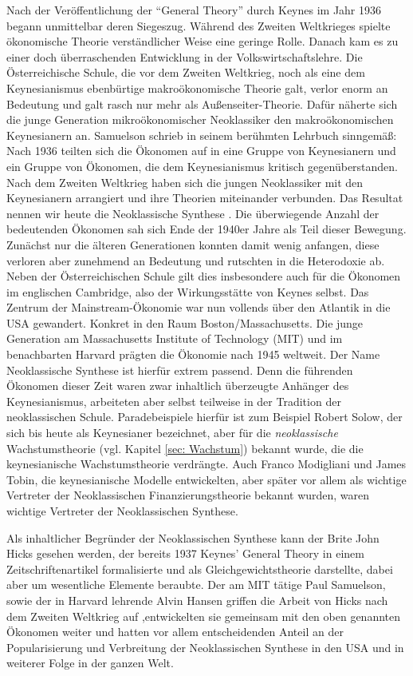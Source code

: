Nach der Veröffentlichung der "`General Theory"' durch Keynes im Jahr 1936 begann unmittelbar deren Siegeszug. Während des Zweiten Weltkrieges spielte ökonomische Theorie verständlicher Weise eine geringe Rolle. Danach kam es zu einer doch überraschenden Entwicklung in der Volkswirtschaftslehre. Die Österreichische Schule, die vor dem Zweiten Weltkrieg, noch als eine dem Keynesianismus ebenbürtige makroökonomische Theorie galt, verlor enorm an Bedeutung und galt rasch nur mehr als Außenseiter-Theorie. Dafür näherte sich die junge Generation mikroökonomischer Neoklassiker den makroökonomischen Keynesianern an. Samuelson schrieb in seinem berühmten Lehrbuch sinngemäß: Nach 1936 teilten sich die Ökonomen auf in eine Gruppe von Keynesianern und ein Gruppe von Ökonomen, die dem Keynesianismus kritisch gegenüberstanden. Nach dem Zweiten Weltkrieg haben sich die jungen Neoklassiker mit den Keynesianern arrangiert und ihre Theorien miteinander verbunden. Das Resultat nennen wir heute die Neoklassische Synthese \parencite[S. 46]{DeVroey2016}. Die überwiegende Anzahl der bedeutenden Ökonomen sah sich Ende der 1940er Jahre als Teil dieser Bewegung. Zunächst nur die älteren Generationen konnten damit wenig anfangen, diese verloren aber zunehmend an Bedeutung und rutschten in die Heterodoxie ab. Neben der Österreichischen Schule gilt dies insbesondere auch für die Ökonomen im englischen Cambridge, also der Wirkungsstätte von Keynes selbst. Das Zentrum der Mainstream-Ökonomie war nun vollends über den Atlantik in die USA gewandert. Konkret in den Raum Boston/Massachusetts. Die junge Generation am Massachusetts Institute of Technology (MIT) und im benachbarten Harvard prägten die Ökonomie nach 1945 weltweit. Der Name Neoklassische Synthese ist hierfür extrem passend. Denn die führenden Ökonomen dieser Zeit waren zwar inhaltlich überzeugte Anhänger des Keynesianismus, arbeiteten aber selbst teilweise in der Tradition der neoklassischen Schule. Paradebeispiele hierfür ist zum Beispiel Robert Solow, der sich bis heute als Keynesianer bezeichnet, aber für die \textit{neoklassische} Wachstumstheorie (vgl. Kapitel \ref{sec: Wachstum}) bekannt wurde, die die keynesianische Wachstumstheorie verdrängte. Auch Franco Modigliani und James Tobin, die keynesianische Modelle entwickelten, aber später vor allem als wichtige Vertreter der Neoklassischen Finanzierungstheorie bekannt wurden, waren wichtige Vertreter der Neoklassischen Synthese.

Als inhaltlicher Begründer der Neoklassischen Synthese kann der Brite John Hicks gesehen werden, der bereits 1937 Keynes' General Theory in einem Zeitschriftenartikel formalisierte und als Gleichgewichtstheorie darstellte, dabei aber um wesentliche Elemente beraubte. Der am MIT tätige Paul Samuelson, sowie der in Harvard lehrende Alvin Hansen griffen die Arbeit von Hicks nach dem Zweiten Weltkrieg auf ,entwickelten sie gemeinsam mit den oben genannten Ökonomen weiter und hatten vor allem entscheidenden Anteil an der Popularisierung und Verbreitung der Neoklassischen Synthese in den USA und in weiterer Folge in der ganzen Welt.

